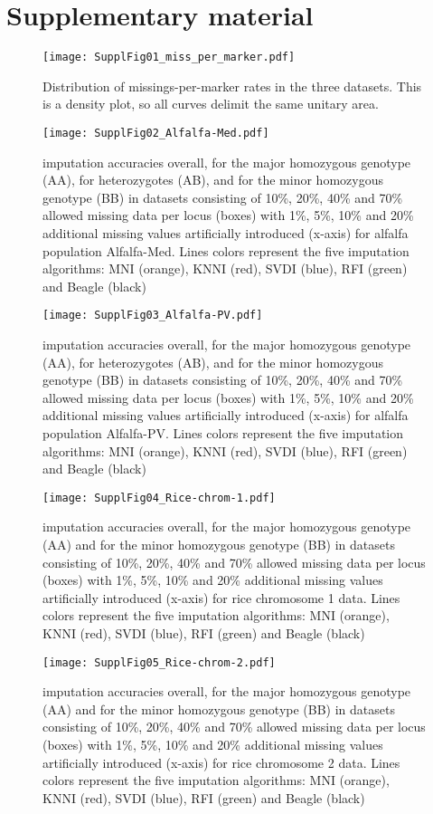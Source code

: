 \section{Supplementary material}
\label{sec:supplementary_material}

\begin{figure}\texttt{[image: SupplFig01\_miss\_per\_marker.pdf]}
\caption{Distribution of missings-per-marker rates in the three datasets. This is a
density plot, so all curves delimit the same unitary area.}
\end{figure}

\begin{figure}\texttt{[image: SupplFig02\_Alfalfa-Med.pdf]}\caption{
imputation accuracies overall, for the major homozygous genotype (AA), for heterozygotes (AB), and for the minor homozygous genotype (BB) in datasets consisting of
10\%, 20\%, 40\% and 70\% allowed missing data per locus (boxes) with 1\%, 5\%, 10\% and 20\%
additional missing values artificially introduced (x-axis) for alfalfa population Alfalfa-Med.
Lines colors represent the five imputation algorithms: MNI
(orange), KNNI (red), SVDI (blue), RFI (green) and Beagle (black)}\end{figure}
\begin{figure}\texttt{[image: SupplFig03\_Alfalfa-PV.pdf]}\caption{
imputation accuracies overall, for the major homozygous genotype (AA), for heterozygotes (AB), and for the minor homozygous genotype (BB) in datasets consisting of
10\%, 20\%, 40\% and 70\% allowed missing data per locus (boxes) with 1\%, 5\%, 10\% and 20\%
additional missing values artificially introduced (x-axis) for alfalfa population Alfalfa-PV.
Lines colors represent the five imputation algorithms: MNI
(orange), KNNI (red), SVDI (blue), RFI (green) and Beagle (black)}\end{figure}
\begin{figure}\texttt{[image: SupplFig04\_Rice-chrom-1.pdf]}\caption{
imputation accuracies overall, for the major homozygous genotype (AA) and for the minor homozygous genotype (BB) in datasets consisting of
10\%, 20\%, 40\% and 70\% allowed missing data per locus (boxes) with 1\%, 5\%, 10\% and 20\%
additional missing values artificially introduced (x-axis) for rice chromosome 1 data.
Lines colors represent the five imputation algorithms: MNI
(orange), KNNI (red), SVDI (blue), RFI (green) and Beagle (black)}\end{figure}
\begin{figure}\texttt{[image: SupplFig05\_Rice-chrom-2.pdf]}\caption{
imputation accuracies overall, for the major homozygous genotype (AA) and for the minor homozygous genotype (BB) in datasets consisting of
10\%, 20\%, 40\% and 70\% allowed missing data per locus (boxes) with 1\%, 5\%, 10\% and 20\%
additional missing values artificially introduced (x-axis) for rice chromosome 2 data.
Lines colors represent the five imputation algorithms: MNI
(orange), KNNI (red), SVDI (blue), RFI (green) and Beagle (black)}\end{figure}
